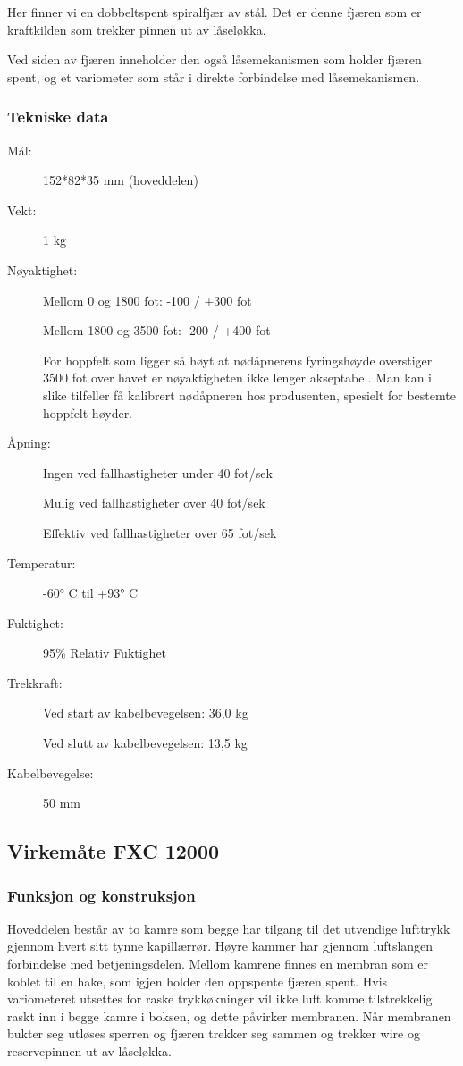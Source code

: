 Her finner vi en dobbeltspent spiralfjær av stål. Det er denne fjæren som er kraftkilden som trekker pinnen ut av låseløkka.

Ved siden av fjæren inneholder den også låsemekanismen som holder fjæren spent, og et variometer som står i direkte forbindelse med låsemekanismen.

\subsubsection{Tekniske data}
\begin{description}
\item[Mål:] 152*82*35 mm (hoveddelen)
\item[Vekt:] 1 kg
\item[Nøyaktighet:] Mellom 0 og 1800 fot: -100 / +300 fot

Mellom 1800 og 3500 fot: -200 / +400 fot

For hoppfelt som ligger så høyt at nødåpnerens fyringshøyde overstiger 3500 fot over havet er nøyaktigheten ikke lenger akseptabel. Man kan i slike tilfeller få kalibrert nødåpneren hos produsenten, spesielt for bestemte hoppfelt høyder.
\item[Åpning:] Ingen ved fallhastigheter under 40 fot/sek

Mulig ved fallhastigheter over 40 fot/sek

Effektiv ved fallhastigheter over 65 fot/sek
\item[Temperatur:] -60° C til +93° C
\item[Fuktighet:] 95\% Relativ Fuktighet
\item[Trekkraft:] Ved start av kabelbevegelsen: 36,0 kg

Ved slutt av kabelbevegelsen: 13,5 kg
\item[Kabelbevegelse:] 50 mm
\end{description}

\subsection{Virkemåte FXC 12000}
\subsubsection{Funksjon og konstruksjon}
Hoveddelen består av to kamre som begge har tilgang til det utvendige lufttrykk gjennom hvert sitt tynne kapillærrør. Høyre kammer har gjennom luftslangen forbindelse med betjeningsdelen. Mellom kamrene finnes en membran som er koblet til en hake, som igjen holder den oppspente fjæren spent. Hvis variometeret utsettes for raske trykkøkninger vil ikke luft komme tilstrekkelig raskt inn i begge kamre i boksen, og dette påvirker membranen. Når membranen bukter seg utløses sperren og fjæren trekker seg sammen og trekker wire og reservepinnen ut av låseløkka.

